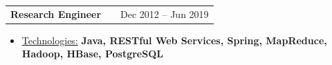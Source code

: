 \documentclass[a4paper,10pt]{article}
\makeatletter
\newenvironment{job}[2]
{
	\begin{tabularx}{\linewidth}{@{}l X r@{}}
		\small
		\textbf{#1} & \hfill &  #2 \\[3.75pt]
	\end{tabularx}
	\footnotesize
	\setlength{\parskip}{3pt} %
	\setlength{\parindent}{0pt} %
}
{
}
\makeatother
\begin{document}
\begin{job}{Research Engineer}{Dec 2012 – Jun 2019}
\begin{itemize}
\begin{itemize}
			
			\item Built distributed spatio-temporal processing (Java/Hadoop/HBase) for trajectory reconstruction and POI analytics with RESTful APIs and PostgreSQL
			
		\end{itemize}
		
		\vspace{-1\baselineskip}
	
		\item \underline{Technologies:} \textbf{Java, RESTful Web Services, Spring, MapReduce, Hadoop, HBase, PostgreSQL}
	
	\end{itemize}
\end{job}

	
		
		
			
		
		
		
		
		
\end{document}
